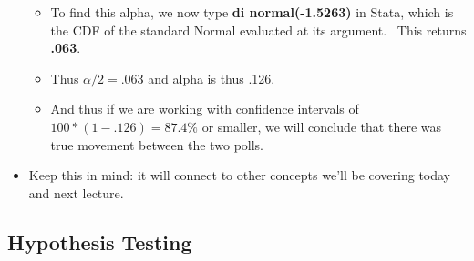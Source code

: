 \documentclass[11pt]{article}
\begin{document}
\begin{itemize}
\begin{itemize}
\item To find this alpha, we now type \textbf{di normal(-1.5263)} in Stata,
which is the CDF of the standard Normal evaluated at its argument. \ This
returns \textbf{.063}. \ 

\item Thus $\alpha /2=.063$ and alpha is thus .126. \ 

\item And thus if we are working with confidence intervals of $100\ast
(1-.126)=87.4\%$ or smaller, we will conclude that there was true movement
between the two polls.
\end{itemize}

\item Keep this in mind: it will connect to other concepts we'll be covering
today and next lecture.
\end{itemize}

\subsection{Hypothesis Testing}
\end{document}
